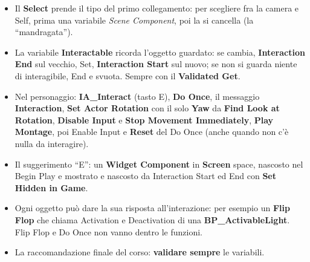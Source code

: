 \begin{itemize}
        \textbf{InteractionTrace} (Ignore di default, Block sugli interagibili).
  \item Il \textbf{Select} prende il tipo del primo collegamento: per scegliere fra la
        camera e Self, prima una variabile \emph{Scene Component}, poi la si cancella (la
        ``mandragata'').
  \item La variabile \textbf{Interactable} ricorda l'oggetto guardato: se cambia,
        \textbf{Interaction End} sul vecchio, Set, \textbf{Interaction Start} sul nuovo;
        se non si guarda niente di interagibile, End e svuota. Sempre con il
        \textbf{Validated Get}.
  \item Nel personaggio: \textbf{IA\_Interact} (tasto E), \textbf{Do Once}, il messaggio
        \textbf{Interaction}, \textbf{Set Actor Rotation} con il solo \textbf{Yaw} da
        \textbf{Find Look at Rotation}, \textbf{Disable Input} e \textbf{Stop Movement
        Immediately}, \textbf{Play Montage}, poi Enable Input e \textbf{Reset} del Do Once
        (anche quando non c'è nulla da interagire).
  \item Il suggerimento ``E'': un \textbf{Widget Component} in \textbf{Screen} space,
        nascosto nel Begin Play e mostrato e nascosto da Interaction Start ed End con
        \textbf{Set Hidden in Game}.
  \item Ogni oggetto può dare la sua risposta all'interazione: per esempio un
        \textbf{Flip Flop} che chiama Activation e Deactivation di una
        \textbf{BP\_ActivableLight}. Flip Flop e Do Once non vanno dentro le funzioni.
  \item La raccomandazione finale del corso: \textbf{validare sempre} le variabili.
\end{itemize}

